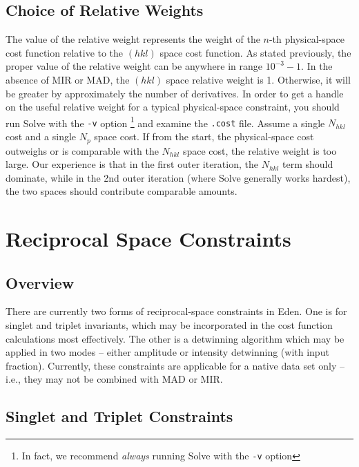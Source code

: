 \documentclass{report}
\begin{document}
{\section {Choice of Relative Weights}
\label{constraints-relwt}

The value of the relative weight represents the weight
of the $n$-th physical-space cost function relative to the $(hkl)$ space
cost function.   As stated previously, the proper value of the relative weight 
can be anywhere in 
range $10^{-3} - 1$.  In the absence of MIR or MAD, 
the $(hkl)$ space relative weight is 1.
Otherwise, it will be greater by approximately the number of derivatives.
In order to get a handle on the useful relative 
weight for a typical physical-space constraint,
you should run Solve with the {\tt -v} option
\footnote{In fact, we recommend {\it always} running Solve with the {\tt -v}
option} and examine the
{\tt .cost} file.  Assume a single $N_{hkl}$ cost and a single $N_p$ space cost.
If from the start, the physical-space cost outweighs or is 
comparable with the $N_{hkl}$ space
cost, the relative weight is too large.  Our experience is that
in the first outer iteration, the $N_{hkl}$ term should dominate, while in the 
2nd outer iteration (where Solve generally works hardest), the two spaces
should contribute comparable amounts.


\chapter {Reciprocal Space Constraints}
\label{RSconstraints}

\section {Overview}
\label{RSconstraints-overview}

There are currently two forms of reciprocal-space constraints in Eden.
One is for singlet and triplet invariants, which may be incorporated in the
cost function calculations most effectively.
The other is a detwinning algorithm which may be applied in two
modes -- either amplitude or intensity detwinning (with input fraction).
Currently, these constraints are applicable for a native data set only --
i.e., they may not be combined with MAD or MIR.

\section {Singlet and Triplet Constraints}
\label{RSconstraints-ST}

}
\end{document}
